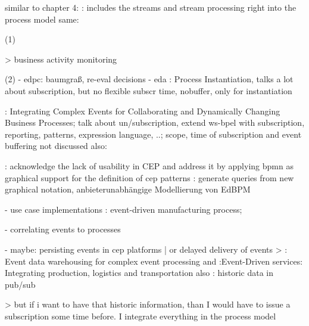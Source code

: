 similar to chapter 4:
\cite{appel2014modeling}: includes the streams and stream processing right into the process model
same: \cite{biornstad2006control}




(1)

> business activity monitoring



(2)
- edpc: baumgraß, re-eval decisions
- eda
\cite{decker2008instantiation}: Process Instantiation, talks a lot about subscription, but no flexible subscr time, nobuffer, only for instantiation

\cite{von2010integrating}: Integrating Complex Events for Collaborating and Dynamically Changing Business Processes; talk about un/subscription, extend ws-bpel with subscription, reporting, patterns, expression language, ..; scope, time of subscription and event buffering not discussed
also: \cite{juric2010wsdl}

\cite{Kunz2010}: acknowledge the lack of usability in CEP and address it by applying bpmn as graphical support for the definition of cep patterns
\cite{gabriel2016konzeptionelle}: generate queries from new graphical notation, anbieterunabhängige Modellierung von EdBPM


- use case implementations
\cite{estruch2012event}: event-driven manufacturing process; 


- correlating events to processes

- maybe: persisting events in cep platforms | or delayed delivery of events
> \cite{roth2010event}: Event data warehousing for complex event processing and \cite{buchmann2010event}:Event-Driven services: Integrating production, logistics and transportation
also \cite{li2007historic}: historic data in pub/sub

> but if i want to have that historic information, than I would have to issue a subscription some time before. I integrate everything in the process model

